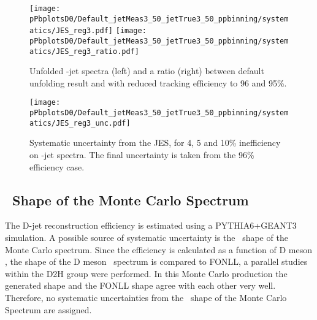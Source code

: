 \begin{figure}[bth]
\centering
\texttt{[image: pPbplotsD0/Default\_jetMeas3\_50\_jetTrue3\_50\_ppbinning/systematics/JES\_reg3.pdf]}
\texttt{[image: pPbplotsD0/Default\_jetMeas3\_50\_jetTrue3\_50\_ppbinning/systematics/JES\_reg3\_ratio.pdf]}
\caption{Unfolded \Dzero-jet spectra (left) and a ratio (right) between default unfolding result and with reduced tracking efficiency to 96 and 95\%.}
\label{fig:JESsys_Dzero}
\end{figure}


\begin{figure}[bth]
\centering
\texttt{[image: pPbplotsD0/Default\_jetMeas3\_50\_jetTrue3\_50\_ppbinning/systematics/JES\_reg3\_unc.pdf]}
\caption{Systematic uncertainty from the JES, for 4, 5 and 10\% inefficiency on \Dzero-jet spectra. The final uncertainty is taken from the 96\% efficiency case. }
\label{fig:JESsys_Dzero}
\end{figure}


\subsection{\pt\ Shape of the Monte Carlo Spectrum}

The D-jet reconstruction efficiency is estimated using a PYTHIA6+GEANT3 simulation.
A possible source of systematic uncertainty is the \ptd\ shape of the Monte Carlo spectrum.
Since the efficiency is calculated as a function of D meson , the shape of the D meson \ptd\ spectrum is compared to FONLL, a parallel studies within the D2H group were performed. In this Monte Carlo production the generated shape and the FONLL shape agree with each other very well. Therefore, no systematic uncertainties from the \ptd\ shape of the Monte Carlo Spectrum are assigned.


